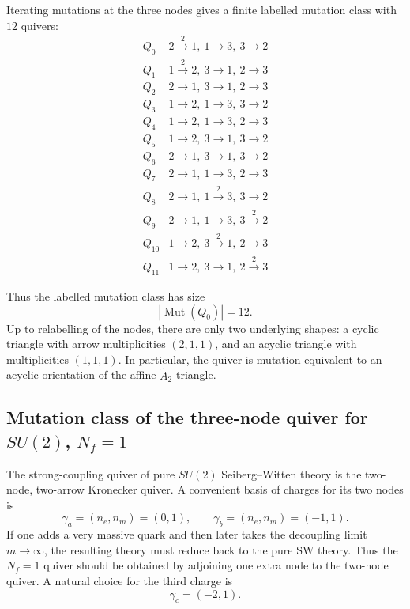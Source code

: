 \documentclass[11pt, a4paper]{article}
\numberwithin{equation}{section}
\begin{document}
Iterating mutations at the three nodes gives a finite labelled mutation
class with \(12\) quivers:
\[
\begin{array}{c|l}
Q_0 & 2\xrightarrow{2}1,\ 1\to3,\ 3\to2\\
Q_1 & 1\xrightarrow{2}2,\ 3\to1,\ 2\to3\\
Q_2 & 2\to1,\ 3\to1,\ 2\to3\\
Q_3 & 1\to2,\ 1\to3,\ 3\to2\\
Q_4 & 1\to2,\ 1\to3,\ 2\to3\\
Q_5 & 1\to2,\ 3\to1,\ 3\to2\\
Q_6 & 2\to1,\ 3\to1,\ 3\to2\\
Q_7 & 2\to1,\ 1\to3,\ 2\to3\\
Q_8 & 2\to1,\ 1\xrightarrow{2}3,\ 3\to2\\
Q_9 & 2\to1,\ 1\to3,\ 3\xrightarrow{2}2\\
Q_{10} & 1\to2,\ 3\xrightarrow{2}1,\ 2\to3\\
Q_{11} & 1\to2,\ 3\to1,\ 2\xrightarrow{2}3
\end{array}
\]

Thus the labelled mutation class has size
\[
|\operatorname{Mut}(Q_0)|=12.
\]
Up to relabelling of the nodes, there are only two underlying shapes:
a cyclic triangle with arrow multiplicities \((2,1,1)\), and an acyclic
triangle with multiplicities \((1,1,1)\). In particular, the quiver is
mutation-equivalent to an acyclic orientation of the affine
\(\widetilde A_2\) triangle.



\appendix

\subsection{Mutation class of the three-node quiver for \texorpdfstring{\(SU(2)\)}{SU(2)}, \texorpdfstring{\(N_f=1\)}{Nf=1}}

The strong-coupling quiver of pure \(SU(2)\) Seiberg--Witten theory is the
two-node, two-arrow Kronecker quiver. A convenient basis of charges for its two
nodes is
\[
\gamma_a=(n_e,n_m)=(0,1),\qquad
\gamma_b=(n_e,n_m)=(-1,1).
\]
If one adds a very massive quark and then later takes the decoupling limit
\(m\to \infty\), the resulting theory must reduce back to the pure SW theory.
Thus the \(N_f=1\) quiver should be obtained by adjoining one extra node to the
two-node quiver. A natural choice for the third charge is
\[
\gamma_c=(-2,1).
\]
\end{document}
